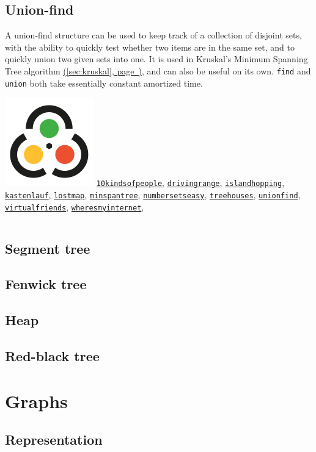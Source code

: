 \documentclass[10pt]{book}
\newcommand{\code}[1]{\inputminted[fontsize=\normalsize]{java}{code/#1}}
\newcommand*{\link}[1]{\hyperref[{#1}]{(\ref*{#1}, page~\pageref*{#1})}}
\newcommand{\kattis}[1]{\href{https://open.kattis.com/problems/#1}{\texttt{#1}}}
\begin{document}
\section{Union-find}

A union-find structure can be used to keep track of a collection of
disjoint sets, with the ability to quickly test whether two items are
in the same set, and to quickly union two given sets into one.  It is
used in Kruskal's Minimum Spanning Tree algorithm \link{sec:kruskal},
and can also be useful on its own.  \texttt{find} and \texttt{union}
both take essentially constant amortized time.

\includegraphics[height=0.9\baselineskip]{Kattis} \kattis{10kindsofpeople}, \kattis{drivingrange},
\kattis{islandhopping}, \kattis{kastenlauf}, \kattis{lostmap},
\kattis{minspantree}, \kattis{numbersetseasy}, \kattis{treehouses},
\kattis{unionfind}, \kattis{virtualfriends},
\kattis{wheresmyinternet},

\code{data-structures/UnionFind.java}

\section{Segment tree}

\section{Fenwick tree}

\section{Heap}

\section{Red-black tree}

\chapter{Graphs}

\section{Representation}
\end{document}
